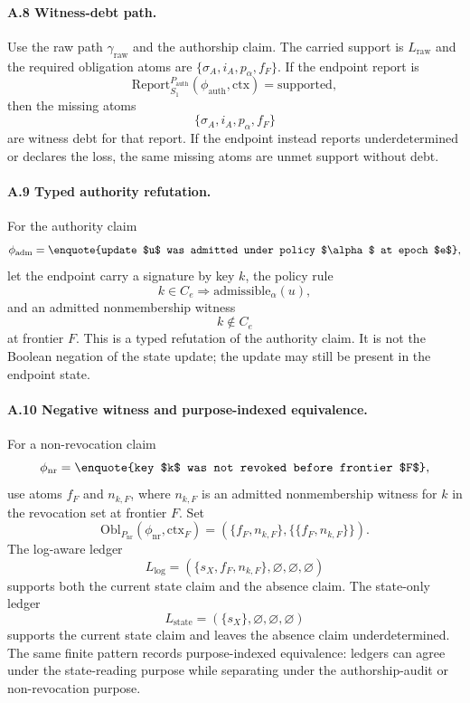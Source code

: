 \documentclass[11pt,twoside]{article}
\theoremstyle{definition}
\newcommand{\Obl}{\mathrm{Obl}}
\newcommand{\Report}{\mathrm{Report}}
\newcommand{\ctx}{\mathrm{ctx}}
\newcommand{\supported}{\mathrm{supported}}
\newcommand{\underdetermined}{\mathrm{underdetermined}}
\begin{document}
\paragraph{A.8 Witness-debt path.}
Use the raw path $\gamma_{\mathrm{raw}}$ and the authorship claim. The carried
support is $L_{\mathrm{raw}}$ and the required obligation atoms are
$\{\sigma_A,i_A,p_\alpha,f_F\}$. If the endpoint report is
\[
  \Report_{S_1}^{P_{\mathrm{auth}}}(\phi_{\mathrm{auth}},\ctx)=\supported,
\]
then the missing atoms
\[
  \{\sigma_A,i_A,p_\alpha,f_F\}
\]
are witness debt for that report. If the endpoint instead reports
$\underdetermined$ or declares the loss, the same missing atoms are unmet
support without debt.

\paragraph{A.9 Typed authority refutation.}
For the authority claim
\[
  \phi_{\mathrm{adm}}=\text{\enquote{update $u$ was admitted under policy $\alpha$ at epoch $e$}},
\]
let the endpoint carry a signature by key $k$, the policy rule
\[
  k\in C_e \Rightarrow \mathrm{admissible}_\alpha(u),
\]
and an admitted nonmembership witness
\[
  k\notin C_e
\]
at frontier $F$. This is a typed refutation of the authority claim. It is not
the Boolean negation of the state update; the update may still be present in
the endpoint state.

\paragraph{A.10 Negative witness and purpose-indexed equivalence.}
For a non-revocation claim
\[
  \phi_{\mathrm{nr}}=\text{\enquote{key $k$ was not revoked before frontier $F$}},
\]
use atoms $f_F$ and $n_{k,F}$, where $n_{k,F}$ is an admitted nonmembership
witness for $k$ in the revocation set at frontier $F$. Set
\[
  \Obl_{P_{\mathrm{nr}}}(\phi_{\mathrm{nr}},\ctx_F)
  =
  (\{f_F,n_{k,F}\},\{\{f_F,n_{k,F}\}\}).
\]
The log-aware ledger
\[
  L_{\log}=(\{s_X,f_F,n_{k,F}\},\varnothing,\varnothing,\varnothing)
\]
supports both the current state claim and the absence claim. The state-only
ledger
\[
  L_{\mathrm{state}}=(\{s_X\},\varnothing,\varnothing,\varnothing)
\]
supports the current state claim and leaves the absence claim underdetermined.
The same finite pattern records purpose-indexed equivalence: ledgers can agree
under the state-reading purpose while separating under the authorship-audit or
non-revocation purpose.
\end{document}
